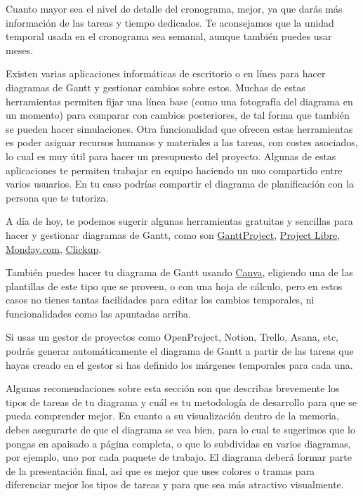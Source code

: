 Cuanto mayor sea el nivel de detalle del cronograma, mejor, ya que darás más información de las tareas y tiempo dedicados. Te aconsejamos que la unidad temporal usada en el cronograma sea semanal, aunque también puedes usar meses. 

Existen varias aplicaciones informáticas de escritorio o en línea para hacer diagramas de Gantt y gestionar cambios sobre estos. Muchas de estas herramientas permiten fijar una línea base (como una fotografía del diagrama en un momento) para comparar con cambios posteriores, de tal forma que también se pueden hacer simulaciones. Otra funcionalidad que ofrecen estas herramientas es poder asignar recursos humanos y materiales a las tareas, con costes asociados, lo cual es muy útil para hacer un presupuesto del proyecto. Algunas de estas aplicaciones te permiten trabajar en equipo haciendo un uso compartido entre varios usuarios. En tu caso podrías compartir el diagrama de planificación con la persona que te tutoriza.

A día de hoy, te podemos sugerir algunas herramientas gratuitas y sencillas para hacer y gestionar diagramas de Gantt, como son \href{https://www.ganttproject.biz/}{GanttProject}, \href{https://www.projectlibre.com/}{Project Libre}, 
 \href{https://www.monday.com}{Monday.com}, \href{https://app.clickup.com/}{Clickup}. 

También puedes hacer tu diagrama de Gantt usando \href{https://www.canva.com/}{Canva}, eligiendo una de las plantillas de este tipo que se proveen, o con una hoja de cálculo, pero en estos casos no tienes tantas facilidades para editar los cambios temporales, ni funcionalidades como las apuntadas arriba. 

Si usas un gestor de proyectos como OpenProject, Notion, Trello, Asana, etc, podrás generar automáticamente el diagrama de Gantt a partir de las tareas que hayas creado en el gestor si has definido los márgenes temporales para cada una.

Algunas recomendaciones sobre esta sección son que describas brevemente los tipos de tareas de tu diagrama y cuál es tu metodología de desarrollo para que se pueda comprender mejor. En cuanto a su visualización dentro de la memoria, debes asegurarte de que el diagrama se vea bien, para lo cual te sugerimos que lo pongas en apaisado a página completa, o que lo subdividas en varios diagramas, por ejemplo, uno por cada paquete de trabajo. El diagrama deberá formar parte de la presentación final, así que es mejor que uses colores o tramas para diferenciar mejor los tipos de tareas y para que sea más atractivo visualmente. 


